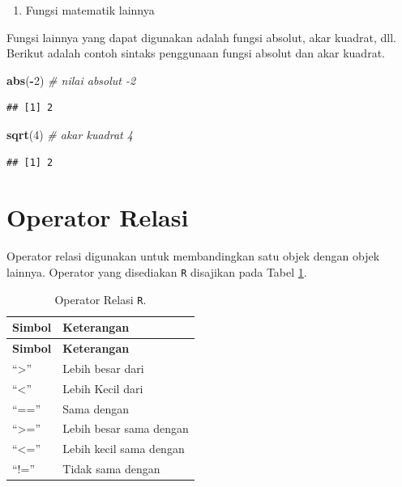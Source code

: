 \documentclass[]{book}
\newenvironment{Shaded}{\begin{snugshade}}{\end{snugshade}}
\newcommand{\CommentTok}[1]{\textcolor[rgb]{0.56,0.35,0.01}{\textit{#1}}}
\newcommand{\DecValTok}[1]{\textcolor[rgb]{0.00,0.00,0.81}{#1}}
\newcommand{\KeywordTok}[1]{\textcolor[rgb]{0.13,0.29,0.53}{\textbf{#1}}}
\newcommand{\NormalTok}[1]{#1}
\newcommand{\OperatorTok}[1]{\textcolor[rgb]{0.81,0.36,0.00}{\textbf{#1}}}
\providecommand{\tightlist}{%
  \setlength{\itemsep}{0pt}\setlength{\parskip}{0pt}}
\theoremstyle{definition}
\theoremstyle{definition}
\theoremstyle{definition}
\theoremstyle{remark}
\begin{document}
\begin{enumerate}
\def\labelenumi{\arabic{enumi}.}
\setcounter{enumi}{3}
\tightlist
\item
  Fungsi matematik lainnya
\end{enumerate}

Fungsi lainnya yang dapat digunakan adalah fungsi absolut, akar kuadrat, dll. Berikut adalah contoh sintaks penggunaan fungsi absolut dan akar kuadrat.

\begin{Shaded}
\begin{Highlighting}[]
\KeywordTok{abs}\NormalTok{(}\OperatorTok{-}\DecValTok{2}\NormalTok{) }\CommentTok{# nilai absolut -2}
\end{Highlighting}
\end{Shaded}

\begin{verbatim}
## [1] 2
\end{verbatim}

\begin{Shaded}
\begin{Highlighting}[]
\KeywordTok{sqrt}\NormalTok{(}\DecValTok{4}\NormalTok{) }\CommentTok{# akar kuadrat 4}
\end{Highlighting}
\end{Shaded}

\begin{verbatim}
## [1] 2
\end{verbatim}

\hypertarget{relationoperators}{%
\section{Operator Relasi}\label{relationoperators}}

Operator relasi digunakan untuk membandingkan satu objek dengan objek lainnya. Operator yang disediakan \texttt{R} disajikan pada Tabel \ref{tab:oprelasi}.

\begin{longtable}[]{@{}ll@{}}
\caption{\label{tab:oprelasi} Operator Relasi \texttt{R}.}\tabularnewline
\toprule
\textbf{Simbol} & \textbf{Keterangan}\tabularnewline
\midrule
\endfirsthead
\toprule
\textbf{Simbol} & \textbf{Keterangan}\tabularnewline
\midrule
\endhead
``\textgreater{}'' & Lebih besar dari\tabularnewline
``\textless{}'' & Lebih Kecil dari\tabularnewline
``=='' & Sama dengan\tabularnewline
``\textgreater{}='' & Lebih besar sama dengan\tabularnewline
``\textless{}='' & Lebih kecil sama dengan\tabularnewline
``!='' & Tidak sama dengan\tabularnewline
\bottomrule
\end{longtable}
\end{document}
